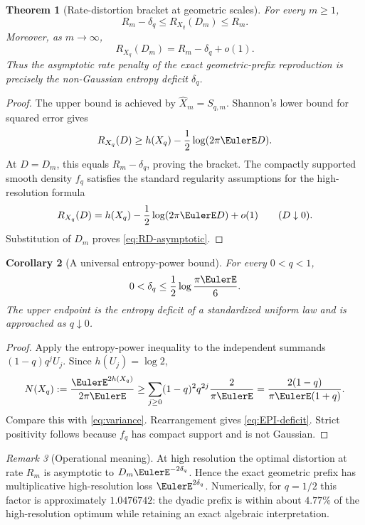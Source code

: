 \documentclass[11pt,oneside]{article}
\newtheorem{theorem}{Theorem}[section]
\newtheorem{corollary}[theorem]{Corollary}
\theoremstyle{definition}
\theoremstyle{remark}
\newtheorem{remark}[theorem]{Remark}
\newcommand{\GeometricPrefixReproduction}[1]{\widehat{X}_{#1}}
\begin{document}
\begin{theorem}[Rate-distortion bracket at geometric scales]
\label{thm:RD-bracket}
For every $m\ge1$,
\begin{equation}
 R_m-\delta_q\le R_{X_q}(D_m)\le R_m.
 \label{eq:RD-bracket}
\end{equation}
Moreover, as $m\to\infty$,
\begin{equation}
 R_{X_q}(D_m)=R_m-\delta_q+o(1).
 \label{eq:RD-asymptotic}
\end{equation}
Thus the asymptotic rate penalty of the exact geometric-prefix reproduction is
precisely the non-Gaussian entropy deficit $\delta_q$.
\end{theorem}

\begin{proof}
The upper bound is achieved by $\GeometricPrefixReproduction{m}=S_{q,m}$.  Shannon's lower bound for
squared error gives
\[
 R_{X_q}(D)\ge h(X_q)-\frac12\log(2\pi\EulerE D).
\]
At $D=D_m$, this equals $R_m-\delta_q$, proving the bracket.  The compactly
supported smooth density $f_q$ satisfies the standard regularity assumptions for
the high-resolution formula
\[
 R_{X_q}(D)=h(X_q)-\frac12\log(2\pi\EulerE D)+o(1)
 \qquad(D\downarrow0).
\]
Substitution of $D_m$ proves \eqref{eq:RD-asymptotic}.
\end{proof}

\begin{corollary}[A universal entropy-power bound]
\label{cor:EPI-deficit}
For every $0<q<1$,
\begin{equation}
 0<\delta_q\le\frac12\log\frac{\pi\EulerE}{6}.
 \label{eq:EPI-deficit}
\end{equation}
The upper endpoint is the entropy deficit of a standardized uniform law and is
approached as $q\downarrow0$.
\end{corollary}

\begin{proof}
Apply the entropy-power inequality to the independent summands
$(1-q)q^jU_j$.  Since $h(U_j)=\log2$,
\[
 N(X_q):=\frac{\EulerE^{2h(X_q)}}{2\pi\EulerE}
 \ge\sum_{j\ge0}(1-q)^2q^{2j}\frac{2}{\pi\EulerE}
 =\frac{2(1-q)}{\pi\EulerE(1+q)}.
\]
Compare this with \eqref{eq:variance}.  Rearrangement gives
\eqref{eq:EPI-deficit}.  Strict positivity follows because $f_q$ has compact
support and is not Gaussian.
\end{proof}

\begin{remark}[Operational meaning]
At high resolution the optimal distortion at rate $R_m$ is asymptotic to
$D_m\EulerE^{-2\delta_q}$.  Hence the exact geometric prefix has multiplicative
high-resolution loss $\EulerE^{2\delta_q}$.  Numerically, for $q=1/2$ this factor is
approximately $1.0476742$: the dyadic prefix is within about $4.77\%$ of the
high-resolution optimum while retaining an exact algebraic interpretation.
\end{remark}
\end{document}
